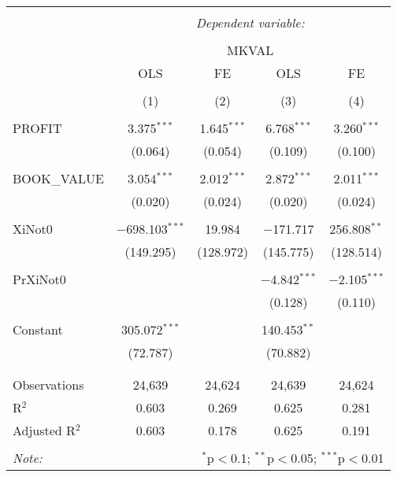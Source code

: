 \documentclass[11pt, letterpaper]{article}
\begin{document}
\begin{table}[!htbp] \centering
\caption{}
\label{3}
\begin{tabular}{@{\extracolsep{5pt}}lcccc}
\\[-1.8ex]\hline
\hline \\[-1.8ex]
& \multicolumn{4}{c}{\textit{Dependent variable:}} \\
\cline{2-5}
\\[-1.8ex] & \multicolumn{4}{c}{MKVAL} \\
& OLS & FE & OLS & FE \\
\\[-1.8ex] & (1) & (2) & (3) & (4)\\
\hline \\[-1.8ex]
PROFIT & 3.375$^{***}$ & 1.645$^{***}$ & 6.768$^{***}$ & 3.260$^{***}$ \\
& (0.064) & (0.054) & (0.109) & (0.100) \\
& & & & \\
BOOK\_VALUE & 3.054$^{***}$ & 2.012$^{***}$ & 2.872$^{***}$ & 2.011$^{***}$ \\
& (0.020) & (0.024) & (0.020) & (0.024) \\
& & & & \\
XiNot0 & $-$698.103$^{***}$ & 19.984 & $-$171.717 & 256.808$^{**}$ \\
& (149.295) & (128.972) & (145.775) & (128.514) \\
& & & & \\
PrXiNot0 & & & $-$4.842$^{***}$ & $-$2.105$^{***}$ \\
& & & (0.128) & (0.110) \\
& & & & \\
Constant & 305.072$^{***}$ & & 140.453$^{**}$ & \\
& (72.787) & & (70.882) & \\
& & & & \\
\hline \\[-1.8ex]
Observations & 24,639 & 24,624 & 24,639 & 24,624 \\
R$^{2}$ & 0.603 & 0.269 & 0.625 & 0.281 \\
Adjusted R$^{2}$ & 0.603 & 0.178 & 0.625 & 0.191 \\
\hline
\hline \\[-1.8ex]
\textit{Note:} & \multicolumn{4}{r}{$^{*}$p$<$0.1; $^{**}$p$<$0.05; $^{***}$p$<$0.01} \\
\end{tabular}
\end{table}
\end{document}
